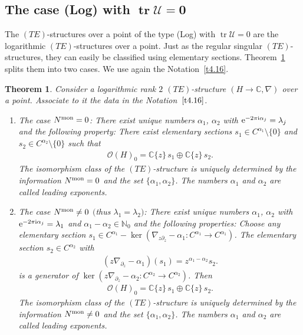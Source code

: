 \documentclass[10pt,a4paper]{amsart}
\numberwithin{equation}{section}
\numberwithin{figure}{section}
\newcommand{\N}{{\mathbb N}}
\newcommand{\C}{{\mathbb C}}
\newcommand{\OO}{{\mathcal O}}
\newcommand{\UU}{{\mathcal U}}
\newcommand{\paa}{\partial}
\newcommand{\nnn}{\nabla}
\DeclareMathOperator{\tr}{tr}
\newtheorem{Theorem}{Theorem}[section]
\begin{document}
\subsection[The case (Log) with $\tr\UU=0$]{The case (Log) with $\boldsymbol{\tr\UU=0}$}\label{c4.6}

The $(TE)$-structures over a point of the type (Log) with
$\tr\UU=0$ are the logarithmic $(TE)$-structures
over a point. Just as the regular singular $(TE)$-structures,
they can easily be classified using
elementary sections. Theorem~\ref{t4.20}
splits them into two cases.
We use again the Notation~\ref{t4.16}.


\begin{Theorem}\label{t4.20}
Consider a logarithmic rank $2$ $(TE)$-structure $(H\to\C,\nnn)$
over a point. Asso\-ci\-ate to it the data in the Notation~$\ref{t4.16}$.
\begin{enumerate}\itemsep=0pt
\item[$(a)$] The case $N^{\rm mon}=0$: There exist unique numbers
$\alpha_1$, $\alpha_2$ with ${\rm e}^{-2\pi {\rm i}\alpha_j}=\lambda_j$
and the following property:
There exist elementary sections $s_1\in C^{\alpha_1}\setminus\{0\}$
and $s_2\in C^{\alpha_2}\setminus\{0\}$ such that
\begin{gather}\label{4.61}
\OO(H)_0 = \C\{z\}\, s_1\oplus \C\{z\}\, s_2.
\end{gather}
The isomorphism class of the $(TE)$-structure is uniquely
determined by the information $N^{\rm mon}=0$ and
the set $\{\alpha_1,\alpha_2\}$.
The numbers $\alpha_1$ and $\alpha_2$ are called
leading exponents.

\item[$(b)$] The case $N^{\rm mon}\neq 0$ $($thus $\lambda_1=\lambda_2)$:
There exist unique numbers $\alpha_1$, $\alpha_2$
with ${\rm e}^{-2\pi {\rm i}\alpha_j}=\lambda_1$ and
$\alpha_1-\alpha_2\in\N_0$ and
the following properties:
Choose any elementary section
$s_1\in C^{\alpha_1}-\ker(\nnn_{z\paa_z}-\alpha_1\colon
C^{\alpha_1}\to C^{\alpha_1})$.
The elementary section $s_2\in C^{\alpha_2}$ with
\begin{gather}\label{4.62}
(z\nnn_{\paa_z}-\alpha_1)(s_1)=z^{\alpha_1-\alpha_2}s_2.
\end{gather}
is a generator of
$\ker(z\nnn_{\paa_z}-\alpha_2\colon C^{\alpha_2}\to C^{\alpha_2})$.
Then
\begin{gather}\label{4.63}
\OO(H)_0=\C\{z\}\, s_1\oplus \C\{z\}\, s_2.
\end{gather}
The isomorphism class of the $(TE)$-structure is
uniquely determined by the information $N^{\rm mon}\neq 0$
and the set $\{\alpha_1,\alpha_2\}$.
The numbers $\alpha_1$ and $\alpha_2$ are called
leading exponents.
\end{enumerate}
\end{Theorem}
\end{document}
